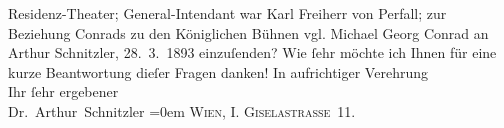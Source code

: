 \begin{ledgroupsized}[t]{13cm}
{{{{                     Residenz-Theater}; General-Intendant war Karl Freiherr von Perfall; zur Beziehung Conrads zu den Königlichen Bühnen vgl. Michael Georg Conrad an Arthur Schnitzler, 28. 3. 1893}}}\label{K_L00009_2h} einzuſenden? Wie ſehr möchte ich Ihnen für eine kurze
               Beantwortung dieſer {\pb}Fragen danken!\pend
           \pstart
           In aufrichtiger Verehrung{\\[\baselineskip]}Ihr ſehr ergebener{\\[\baselineskip]}\spacefill\mbox{Dr. Arthur Schnitzler}\pend
           \leftskip=0em{}\pstart
           \noindent{}\textsc{Wien, I. Giselastraße 11.}\pend
                     \endnumbering{}\end{ledgroupsized}  \newcommand{\dateiname}{L00009}\newcommand{\titel}{Arthur Schnitzler an Michael Georg Conrad, 11. 3. 1891}\newcommand{\editorInnen}{Martin Anton Müller und Gerd-Hermann Susen}
            \footnotesize
\begin{ledgroupsized}[t]{11.5cm}
\end{ledgroupsized}
         
      